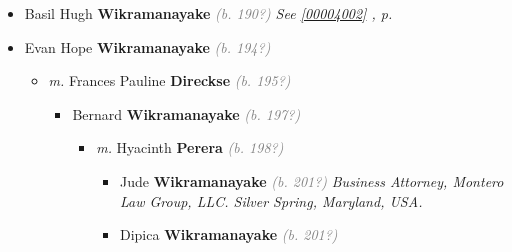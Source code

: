 \documentclass[10pt, openany]{book}
\begin{document}
\begin{itemize}
{\begin{itemize}
{\begin{itemize}
{\begin{itemize}
\item{Dileeni \textbf{Wikramanayake} \textcolor{gray}{\textit{(b. 193?)}}
 }
\item{Prenitha \textbf{Wikramanayake} \textcolor{gray}{\textit{(b. 193?)}}
\begin{itemize}
\item{\textit{m.} Margeret \textbf{Chemello} \textcolor{gray}{\textit{(b. 194?)}}   \label{couple:00003997:00003998} \begin{itemize}
\item{Nicola \textbf{Wikramanayake} \textcolor{gray}{\textit{(b. 197?)}}
 }
\item{Chiara \textbf{Wikramanayake} \textcolor{gray}{\textit{(b. 197?)}}
 }
\item{Guy Jr \textbf{Wikramanayake} \textcolor{gray}{\textit{(b. 197?)}}
  }
\end{itemize}}
\end{itemize}
 }
\end{itemize}}
\end{itemize}
  }
\item{Basil Hugh \textbf{Wikramanayake} \textcolor{gray}{\textit{(b. 190?)}} \textcolor{slteal}{\textit{See  \autoref{00004002} \textit{, p. \pageref{00004002} }}}}
\item{Evan Hope \textbf{Wikramanayake} \textcolor{gray}{\textit{(b. 194?)}}
\begin{itemize}
\item{\textit{m.} Frances Pauline \textbf{Direckse} \textcolor{gray}{\textit{(b. 195?)}}   \label{couple:00004014:00004015} \begin{itemize}
\item{Bernard \textbf{Wikramanayake} \textcolor{gray}{\textit{(b. 197?)}}
\begin{itemize}
\item{\textit{m.} Hyacinth \textbf{Perera} \textcolor{gray}{\textit{(b. 198?)}}   \label{couple:00004016:00004017} \begin{itemize}
\item{Jude \textbf{Wikramanayake} \textcolor{gray}{\textit{(b. 201?)}} \textcolor{slmaroon}{\textit{Business Attorney, Montero Law Group, LLC. Silver Spring, Maryland, USA.}}
 }
\item{Dipica \textbf{Wikramanayake} \textcolor{gray}{\textit{(b. 201?)}}
}
\end{itemize}}
\end{itemize}}
\end{itemize}}
\end{itemize}}
\end{itemize}}
\end{itemize}
\end{document}
